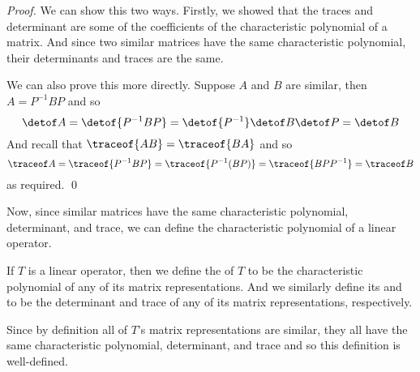 \begin{proof}

    We can show this two ways.
    Firstly, we showed that the traces and determinant are some of the coefficients of the characteristic polynomial of a matrix.
    And since two similar matrices have the same characteristic polynomial, their determinants and traces are the same.

    We can also prove this more directly.
    Suppose $A$ and $B$ are similar, then $A=P^{-1}BP$ and so
    \[ \detof A = \detof{P^{-1}BP} = \detof{P^{-1}}\detof B\detof P = \detof B \]
    And recall that $\traceof{AB}=\traceof{BA}$ and so
    \[ \traceof A = \traceof{P^{-1}BP} = \traceof{P^{-1}(BP)} = \traceof{BPP^{-1}} = \traceof B \]
    as required.
    \qed

\end{proof}

Now, since similar matrices have the same characteristic polynomial, determinant, and trace, we can define the characteristic polynomial of a linear operator.

\begin{defn*}

    If $T$ is a linear operator, then we define the  of $T$ to be the characteristic polynomial of any of its matrix representations.
    And we similarly define its  and  to be the determinant and trace of any of its matrix representations, respectively.

\end{defn*}

Since by definition all of $T$'s matrix representations are similar, they all have the same characteristic polynomial, determinant, and trace and so this definition is well-defined.

